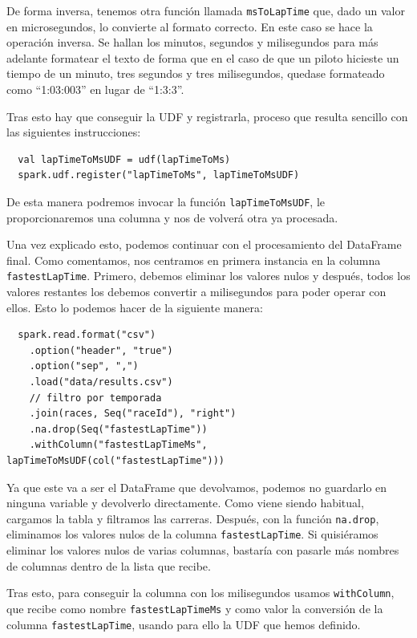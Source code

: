 \documentclass[12pt,twoside,titlepage]{report}
\newcommand{\quotes}[1]{``#1''}
\begin{document}
De forma inversa, tenemos otra función llamada \texttt{msToLapTime} que, dado un valor en microsegundos, lo convierte al formato correcto. En este caso se hace la operación inversa. Se hallan los minutos, segundos y milisegundos para más adelante formatear el texto de forma que en el caso de que un piloto hicieste un tiempo de un minuto, tres segundos y tres milisegundos, quedase formateado como \quotes{1:03:003} en lugar de \quotes{1:3:3}.

Tras esto hay que conseguir la UDF y registrarla, proceso que resulta sencillo con las siguientes instrucciones:


\begin{lstlisting}
  val lapTimeToMsUDF = udf(lapTimeToMs)
  spark.udf.register("lapTimeToMs", lapTimeToMsUDF)
\end{lstlisting}

De esta manera podremos invocar la función \texttt{lapTimeToMsUDF}, le proporcionaremos una columna y nos de volverá otra ya procesada.

Una vez explicado esto, podemos continuar con el procesamiento del DataFrame final. Como comentamos, nos centramos en primera instancia en la columna \texttt{fastestLapTime}. Primero, debemos eliminar los valores nulos y después, todos los valores restantes los debemos convertir a milisegundos para poder operar con ellos. Esto lo podemos hacer de la siguiente manera:

\begin{lstlisting}
  spark.read.format("csv")
    .option("header", "true")
    .option("sep", ",")
    .load("data/results.csv")
    // filtro por temporada
    .join(races, Seq("raceId"), "right")
    .na.drop(Seq("fastestLapTime"))
    .withColumn("fastestLapTimeMs", lapTimeToMsUDF(col("fastestLapTime")))
\end{lstlisting}

Ya que este va a ser el DataFrame que devolvamos, podemos no guardarlo en ninguna variable y devolverlo directamente. Como viene siendo habitual, cargamos la tabla y filtramos las carreras. Después, con la función \texttt{na.drop}, eliminamos los valores nulos de la columna \texttt{fastestLapTime}. Si quisiéramos eliminar los valores nulos de varias columnas, bastaría con pasarle más nombres de columnas dentro de la lista que recibe.

Tras esto, para conseguir la columna con los milisegundos usamos \texttt{withColumn}, que recibe como nombre \texttt{fastestLapTimeMs} y como valor la conversión de la columna \texttt{fastestLapTime}, usando para ello la UDF que hemos definido.
\end{document}
